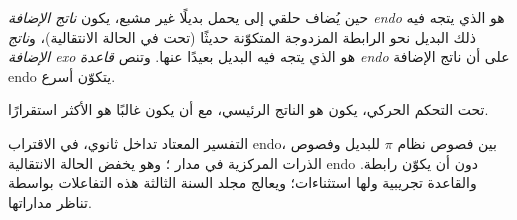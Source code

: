 \begin{definition}\label{def:b2:frontier-orbitals:endo}
حين يُضاف  حلقي إلى  يحمل بديلًا غير مشبع، يكون
\emph{ناتج الإضافة endo} هو الذي يتجه فيه ذلك البديل نحو الرابطة المزدوجة
المتكوّنة حديثًا (تحت  في الحالة الانتقالية)، و\emph{ناتج
الإضافة exo} هو الذي يتجه فيه البديل بعيدًا عنها. وتنص \emph{قاعدة endo}
على أن ناتج الإضافة endo يتكوّن أسرع.
\end{definition}

\begin{proposition}\label{prop:b2:frontier-orbitals:endo}
تحت التحكم الحركي، يكون  هو الناتج الرئيسي، مع أن 
يكون غالبًا هو الأكثر استقرارًا.
\end{proposition}

\admitted

التفسير المعتاد تداخل ثانوي، في الاقتراب endo، بين
فصوص نظام $\pi$ للبديل وفصوص الذرات المركزية في مدار 
؛ وهو يخفض الحالة الانتقالية endo دون أن يكوّن رابطة. والقاعدة
تجريبية ولها استثناءات؛ ويعالج مجلد السنة الثالثة هذه التفاعلات بواسطة
تناظر مداراتها.

